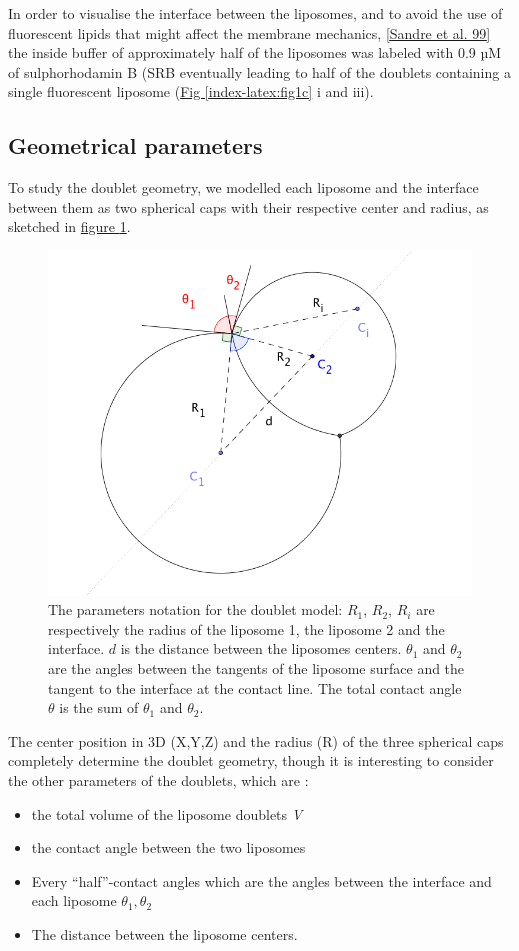 \documentclass[A4paperpaper,11pt,english]{sphinxmanual}
\begin{document}
In order to visualise the interface between the liposomes, and to avoid the use of fluorescent
lipids that might affect the membrane mechanics, {\hyperref[index-latex:sandre1999]{{[}Sandre et al. 99{]}}} the inside
buffer of approximately half of the liposomes was labeled with 0.9 µM
of sulphorhodamin B (SRB
eventually leading to half of the doublets containing a single fluorescent liposome (\hyperref[index-latex:fig1c]{Fig  \ref*{index-latex:fig1c}} i and iii).


\subsection{Geometrical parameters}
\label{index-latex:geometrical-parameters}
To study the doublet geometry, we modelled each liposome and the interface
between them as two spherical caps with their respective center and radius, as
sketched in \hyperref[index-latex:fig-notations-doublets]{figure  \ref*{index-latex:fig-notations-doublets}}.
\begin{figure}[htbp]
\centering
\capstart

\includegraphics[width=0.500\linewidth]{notations-doublets.png}
\caption{The parameters notation for the doublet model: \(R_1\), \(R_2\), \(R_i\) are respectively the
radius of the liposome 1, the liposome 2 and the interface. \(d\) is the
distance between the liposomes centers. \(\theta_1\) and \(\theta_2\) are the angles between
the tangents of the liposome surface and the tangent to the interface at the
contact line. The total contact angle \(\theta\) is the sum of \(\theta_1\) and \(\theta_2\).}\label{index-latex:fig-notations-doublets}\end{figure}

The center position in 3D (X,Y,Z) and the radius (R) of the three spherical caps
completely determine the doublet geometry, though it is interesting to consider the other
parameters of the doublets, which are :
\begin{itemize}
\item {} 
the total volume of the liposome doublets \emph{V}

\item {} 
the contact angle between the two liposomes

\item {} 
Every ``half''-contact angles which are the angles between the
interface and each liposome \(\theta_1,\theta_2\)

\item {} 
The distance between the liposome centers.

\end{itemize}
\end{document}
